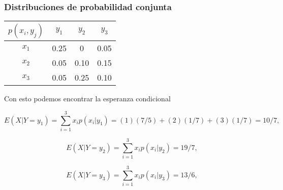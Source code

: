 \documentclass[spanish]{beamer}
\begin{document}
\begin{frame}
\frametitle{Distribuciones de probabilidad conjunta}

\begin{center}
\begin{tabular}{ c c c c } 
\hline
$p(x_{i},y_{j})$ & $y_{1}$ & $y_{2}$ & $y_{3}$\\
 \hline
 $x_{1}$ & 0.25 & 0  & 0.05\\ 
 $x_{2}$ & 0.05 & 0.10 & 0.15\\ 
 $x_{3}$ & 0.05 & 0.25 & 0.10\\ 
 \hline
\end{tabular}
\end{center}
Con esto podemos encontrar la esperanza condicional 

\begin{equation*}
E(X|Y=y_{1}) = \sum_{i=1}^3 x_{i}p(x_{i}\vert y_{1}) = (1)(7/5)+ (2)(1/7)+(3)(1/7) = 10/7,
\end{equation*}

\begin{equation*} 
E(X|Y=y_{2}) = \sum_{i=1}^3 x_{i}p(x_{i}\vert y_{2}) = 19/7,
\end{equation*}

\begin{equation*}
E(X|Y=y_{3}) = \sum_{i=1}^3 x_{i}p(x_{i}\vert y_{3}) = 13/6,
\end{equation*}
\end{frame}
\end{document}
